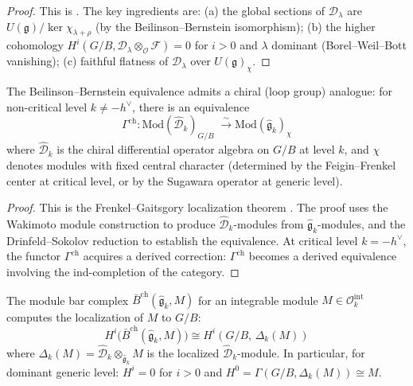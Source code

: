 \begin{proof}
This is \cite[Theorem~1.1]{BB81}.
The key ingredients are: (a) the global sections of
$\mathcal{D}_\lambda$ are $U(\mathfrak{g})/\ker\chi_{\lambda+\rho}$
(by the Beilinson--Bernstein isomorphism); (b) the higher cohomology
$H^i(G/B, \mathcal{D}_\lambda \otimes_{\mathcal{O}} \mathcal{F}) = 0$
for $i > 0$ and $\lambda$ dominant (Borel--Weil--Bott vanishing);
(c) faithful flatness of $\mathcal{D}_\lambda$ over
$U(\mathfrak{g})_\chi$.
\end{proof}

\begin{theorem}
\label{thm:chiral-localization}
The Beilinson--Bernstein equivalence admits a chiral (loop group)
analogue: for non-critical level $k \neq -h^\vee$, there is an
equivalence
\[
\Gamma^{\mathrm{ch}}:
\mathrm{Mod}(\widehat{\mathcal{D}}_k)_{G/B}
\;\xrightarrow{\;\sim\;}
\mathrm{Mod}(\widehat{\mathfrak{g}}_k)_\chi
\]
where $\widehat{\mathcal{D}}_k$ is the chiral differential operator
algebra on $G/B$ at level $k$, and $\chi$ denotes modules with
fixed central character \textup{(}determined by the Feigin--Frenkel
center at critical level, or by the Sugawara operator at generic
level\textup{)}.
\end{theorem}

\begin{proof}
This is the Frenkel--Gaitsgory localization theorem
\cite[Theorem~1]{FG06}.
The proof uses the Wakimoto module construction
to produce $\widehat{\mathcal{D}}_k$-modules from
$\widehat{\mathfrak{g}}_k$-modules, and the Drinfeld--Sokolov
reduction to establish the equivalence. At critical level
$k = -h^\vee$, the functor $\Gamma^{\mathrm{ch}}$ acquires a
derived correction: $\Gamma^{\mathrm{ch}}$ becomes a derived
equivalence involving the ind-completion of the category.
\end{proof}

\begin{proposition}
\label{prop:bar-localization}
The module bar complex
$\bar{B}^{\mathrm{ch}}(\widehat{\mathfrak{g}}_k, M)$ for an
integrable module $M \in \mathcal{O}_k^{\mathrm{int}}$ computes the
localization of $M$ to $G/B$:
\begin{equation}\label{eq:bar-localization}
H^i\bigl(\bar{B}^{\mathrm{ch}}(\widehat{\mathfrak{g}}_k, M)\bigr)
\cong
H^i(G/B,\, \Delta_k(M))
\end{equation}
where $\Delta_k(M) = \widehat{\mathcal{D}}_k
\otimes_{\widehat{\mathfrak{g}}_k} M$ is the localized
$\widehat{\mathcal{D}}_k$-module. In particular, for dominant
generic level: $H^i = 0$ for $i > 0$ and
$H^0 = \Gamma(G/B, \Delta_k(M)) \cong M$.
\end{proposition}

